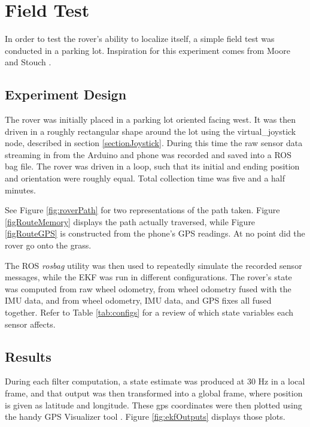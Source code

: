 \chapter{Field Test}

In order to test the rover's ability to localize itself, a simple field test was conducted in a parking lot. Inspiration for this experiment comes from Moore and Stouch \cite{robot_localization_paper}.

\section{Experiment Design}

The rover was initially placed in a parking lot oriented facing west. It was then driven in a roughly rectangular shape around the lot using the virtual\_joystick node, described in section \ref{sectionJoystick}. During this time the raw sensor data streaming in from the Arduino and phone was recorded and saved into a ROS bag file. The rover was driven in a loop, such that its initial and ending position and orientation were roughly equal. Total collection time was five and a half minutes.

See Figure \ref{fig:roverPath} for two representations of the path taken. Figure \ref{figRouteMemory} displays the path actually traversed, while Figure \ref{figRouteGPS} is constructed from the phone's GPS readings. At no point did the rover go onto the grass.

The ROS \textit{rosbag} utility was then used to repeatedly simulate the recorded sensor messages, while the EKF was run in different configurations. The rover's state was computed from raw wheel odometry, from wheel odometry fused with the IMU data, and from wheel odometry, IMU data, and GPS fixes all fused together. Refer to Table \ref{tab:configs} for a review of which state variables each sensor affects.

\section{Results}


During each filter computation, a state estimate was produced at 30 Hz in a local frame, and that output was then transformed into a global frame, where position is given as latitude and longitude. These gps coordinates were then plotted using the handy GPS Visualizer tool \cite{gps_visualizer}. Figure \ref{fig:ekfOutputs} displays those plots.

